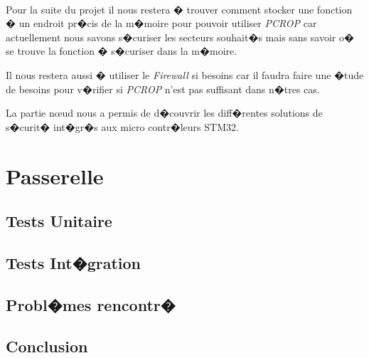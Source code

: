 \documentclass[a4paper, titlepage,12pt]{report}
\begin{document}
\paragraph{}
Pour la suite du projet il nous restera � trouver comment stocker une fonction � un endroit pr�cis de la m�moire pour pouvoir utiliser \textit{PCROP} car actuellement nous savons s�curiser les secteurs souhait�s mais sans savoir o� se trouve la fonction � s�curiser dans la m�moire.

Il nous restera aussi � utiliser le \textit{Firewall} si besoins car il faudra faire une �tude de besoins pour v�rifier si \textit{PCROP} n'est pas suffisant dans n�tres cas.

La partie n\oe{}ud nous a permis de d�couvrir les diff�rentes solutions de s�curit� int�gr�s aux micro contr�leurs STM32.
\section{Passerelle}
\paragraph{}

\subsection{Tests Unitaire}
\paragraph{}

\subsection{Tests Int�gration}
\paragraph{}

\subsection{Probl�mes rencontr�}
\paragraph{}

\subsection{Conclusion}
\end{document}
